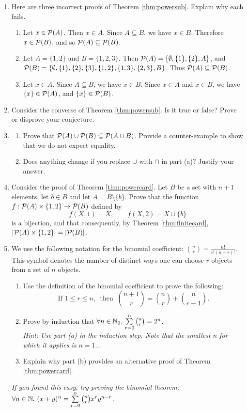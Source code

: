 \begin{exercises}{}{}
\begin{enumerate}
	\item\label{ex:powersub1} Here are three incorrect proofs of Theorem \ref{thm:powersub}. Explain why each fails.
	\begin{enumerate}
		\item Let $x\in\mathcal{P}(A)$. Then $x\in A$. Since $A\subseteq B$, we have $x\in B$. Therefore $x\in\mathcal{P}(B)$, and so $\mathcal{P}(A)\subseteq\mathcal{P}(B)$.
		\item Let $A=\{1,2\}$ and $B=\{1,2,3\}$. Then $\mathcal{P}(A)=\{\emptyset,\{1\},\{2\},A\}$, and\\
		$\mathcal{P}(B)=\{\emptyset,\{1\},\{2\},\{3\},\{1,2\},\{1,3\},\{2,3\},B\}$. Thus $\mathcal{P}(A)\subseteq\mathcal{P}(B)$.
		\item Let $x\in A$. Since $A\subseteq B$, we have $x\in B$. Since $x\in A$ and $x\in B$, we have $\{x\}\in\mathcal{P}(A)$, and $\{x\}\in\mathcal{P}(B)$.
	\end{enumerate}
	
	\item\label{ex:powersub2} Consider the converse of Theorem \ref{thm:powersub}. Is it true or false? Prove or disprove your conjecture.
	
	\item\begin{enumerate}
	  \item Prove that $\mathcal{P}(A)\cup\mathcal{P}(B)\subseteq\mathcal{P}(A\cup B)$. Provide a counter-example to show that we do not expect equality.
	  \item Does anything change if you replace $\cup$ with $\cap$ in part (a)? Justify your answer.
	\end{enumerate}
	
	\item Consider the proof of Theorem \ref{thm:powercard}. Let $B$ be a set with $n+1$ elements, let $b\in B$ and let $A=B\setminus\{b\}$. Prove that the function $f:\mathcal{P}(A)\times\{1,2\}\to\mathcal{P}(B)$ defined by
	\[f(X,1)=X,\qquad f(X,2)=X\cup\{b\}\]
	is a bijection, and that consequently, by Theorem \ref{thm:finitecard}, $\left| \mathcal{P}(A)\times\{1,2\}\right|=\left| \mathcal{P}(B)\right|$.
	
	\item\label{ex:binom} We use the following notation for the binomial coefficient: $\binom nr=\frac{n!}{r!(n-r)!}$. This symbol denotes the number of distinct ways one can choose $r$ objects from a set of $n$ objects.
	\begin{enumerate}
	  \item Use the definition of the binomial coefficient to prove the following:
	  \[\text{If } 1\le r\le n,\ \text{ then }\ \binom{n+1}r=\binom nr+\binom n{r-1}.\]
		\item Prove by induction that $\forall n\in\mathbb{N}_0,\,\sum\limits_{r=0}^n\binom nr=2^n$.\\
		\emph{Hint: Use part (a) in the induction step. Note that the smallest $n$ for which it applies is $n=1\ldots$}
		\item Explain why part (b) provides an alternative proof of Theorem \ref{thm:powercard}.
	\end{enumerate}
	\emph{If you found this easy, try proving the binomial theorem: $\forall n\in\mathbb{N},\,(x+y)^n=\sum\limits_{r=0}^n\binom nrx^ry^{n-r}$.}
\end{enumerate}


\end{exercises}
